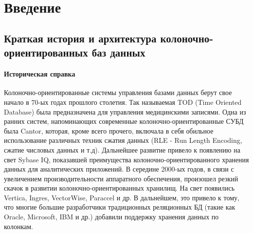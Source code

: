 \documentclass{matmex-diploma}
\begin{document}
\maketitle
\tableofcontents
\section*{Введение}
    \subsection{Краткая история и архитектура колоночно-ориентированных баз данных}
        \paragraph{Историческая справка}
            Колоночно-ориентированные системы управления базами данных берут свое начало в 70-ых годах прошлого столетия. Так называемая TOD (Time Oriented Database) была предназначена для управления медицинскими записями. Одна из ранних систем, напоминающих современные колоночно-ориентированные СУБД была Cantor, которая, кроме всего прочего, включала в себя обильное использование различных техник сжатия данных (RLE - Run Length Encoding, сжатие числовых данных и т.д). Дальнейшее развитие привело к появлению на свет Sybase IQ, показавшей преимущества колоночно-ориентированного хранения данных для аналитических приложений. В середине 2000-ых годов, в связи с увеличением производительности аппаратного обеспечения, произошел резкий скачок в развитии колоночно-ориентированных хранилищ. На свет появились Vertica, Ingres, VectorWise, Paraccel и др. В дальнейшем, это привело к тому, что многие большие разработчики традиционных реляционных БД (такие как Oracle, Microsoft, IBM и др.) добавили поддержку хранения данных по колонкам. \cite{abadidesign}
\end{document}
